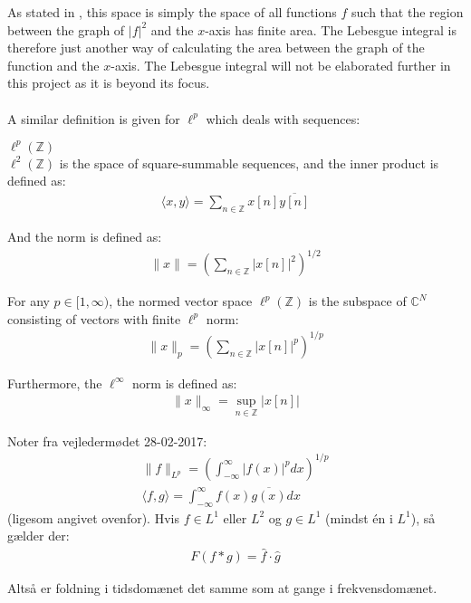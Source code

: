 As stated in \cite{page 74, FAA}, this space is simply the space of all functions $f$ such that the region between the graph of $|f|^2$ and the $x$-axis has finite area. The Lebesgue integral is therefore just another way of calculating the area between the graph of the function and the $x$-axis. The Lebesgue integral will not be elaborated further in this project as it is beyond its focus.
\\ \\
A similar definition is given for $\ell^p$ which deals with sequences:
\begin{definition}{$\ell^p(\mathbb{Z})$}
\\
$\ell^2(\mathbb{Z})$ is the space of square-summable sequences, and the inner product is defined as:
\begin{align*}
\langle x,y \rangle = \sum_{n\in\mathbb{Z}} x[n] \overline{y[n]}
\end{align*}

And the norm is defined as:
\begin{align*}
\|x\| = \left( \sum_{n\in\mathbb{Z}} |x[n]|^2 \right)^{1/2}
\end{align*}

For any $p \in [1,\infty)$, the normed vector space $\ell^p(\mathbb{Z})$ is the subspace of $\mathbb{C}^N$ consisting of vectors with finite $\ell^p$ norm:
\begin{align*}
\|x\|_p = \left( \sum_{n\in\mathbb{Z}} |x[n]|^p \right)^{1/p}
\end{align*}

Furthermore, the $\ell^\infty$ norm is defined as:
\begin{align*}
\|x\|_\infty = \sup_{n\in\mathbb{Z}}|x[n]|
\end{align*}
\end{definition}


Noter fra vejledermødet 28-02-2017:
\begin{align*}
\|f\|_{L^p} = \left( \int_{-\infty}^\infty |f(x)|^p dx \right)^{1/p} \\
\langle f,g \rangle = \int_{-\infty}^\infty f(x) \overline{g(x)} dx
\end{align*}
(ligesom angivet ovenfor). Hvis $f \in L^1$ eller $L^2$ og $g \in L^1$ (mindst én i $L^1$), så gælder der:
\begin{align*}
F(f*g) = \hat{f} \cdot \hat{g}
\end{align*}

Altså er foldning i tidsdomænet det samme som at gange i frekvensdomænet.


